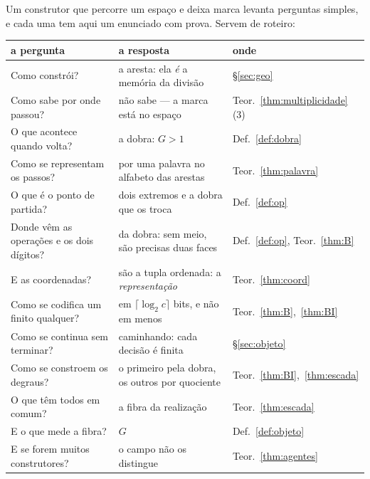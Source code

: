 \documentclass[11pt,a4paper]{article}
\begin{document}
\noindent Um construtor que percorre um espaço e deixa marca levanta perguntas
simples, e cada uma tem aqui um enunciado com prova. Servem de roteiro:

\begin{center}\small
\begin{tabular}{@{}p{}p{}l@{}}
\toprule
a pergunta & a resposta & onde \\
\midrule
Como constrói? & a aresta: ela \emph{é} a memória da divisão & §\ref{sec:geo} \\
Como sabe por onde passou? & não sabe --- a marca está no espaço & Teor.~\ref{thm:multiplicidade}(3) \\
O que acontece quando volta? & a dobra: $G>1$ & Def.~\ref{def:dobra} \\
Como se representam os passos? & por uma palavra no alfabeto das arestas & Teor.~\ref{thm:palavra} \\
O que é o ponto de partida? & dois extremos e a dobra que os troca & Def.~\ref{def:op} \\
Donde vêm as operações e os dois dígitos? & da dobra: sem meio, são precisas duas faces & Def.~\ref{def:op}, Teor.~\ref{thm:B} \\
E as coordenadas? & são a tupla ordenada: a \emph{representação} & Teor.~\ref{thm:coord} \\
Como se codifica um finito qualquer? & em $\lceil\log_2 c\rceil$ bits, e não em menos & Teor.~\ref{thm:B},~\ref{thm:BI} \\
Como se continua sem terminar? & caminhando: cada decisão é finita & §\ref{sec:objeto} \\
Como se constroem os degraus? & o primeiro pela dobra, os outros por quociente & Teor.~\ref{thm:BI},~\ref{thm:escada} \\
O que têm todos em comum? & a fibra da realização & Teor.~\ref{thm:escada} \\
E o que mede a fibra? & $G$ & Def.~\ref{def:objeto} \\
E se forem muitos construtores? & o campo não os distingue & Teor.~\ref{thm:agentes} \\
\bottomrule
\end{tabular}
\end{center}
\end{document}
